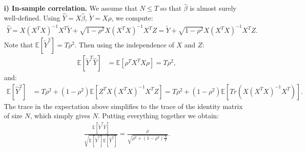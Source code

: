 \documentclass{article}
\begin{document}
\vspace{\baselineskip}
\noindent
\textbf{i) In-sample correlation.} We assume that $N \leq T$ so that $\widehat \beta$ is almost surely well-defined. Using $\widehat Y = X \widehat \beta$, $\widetilde Y = X \rho$, we compute:
\begin{align*}
\widehat Y = X (X^T X)^{-1} X^T \widetilde Y + \sqrt{1 - \rho^2} X (X^T X)^{-1} X^T Z  = \widetilde Y + \sqrt{1 - \rho^2} X (X^T X)^{-1} X^T Z.
\end{align*}
Note that $\mathbb{E}[\widetilde Y^2] = T \rho^2$. Then using the independence of $X$ and $Z$:
\begin{align*}
\mathbb{E}[\widetilde Y ^T \widehat Y] &= \mathbb{E}[\rho^{T} X^T X \rho] = T \rho^2,
\end{align*}
and:
\begin{align*}
\mathbb{E}[ \widehat Y ^2] &= T \rho^2 + (1 - \rho^2)  \mathbb{E}[Z^T X (X^T X)^{-1} X^T Z] = T \rho^2 + (1 - \rho^2)  \mathbb{E}[Tr(X (X^T X)^{-1} X^T)].
\end{align*}
The trace in the expectation above simplifies to the trace of the identity matrix of size $N$, which simply gives $N$. Putting everything together we obtain:
\begin{align}
\frac{\mathbb{E}[\widetilde Y ^T \widehat Y]}{\sqrt{\mathbb{E}[ \widetilde Y ^2]  \mathbb{E}[ \widehat Y ^2]}} = \frac{\rho}{\sqrt{\rho^2 + (1- \rho^2) \frac{N}{T}}}.
\end{align}
\end{document}
